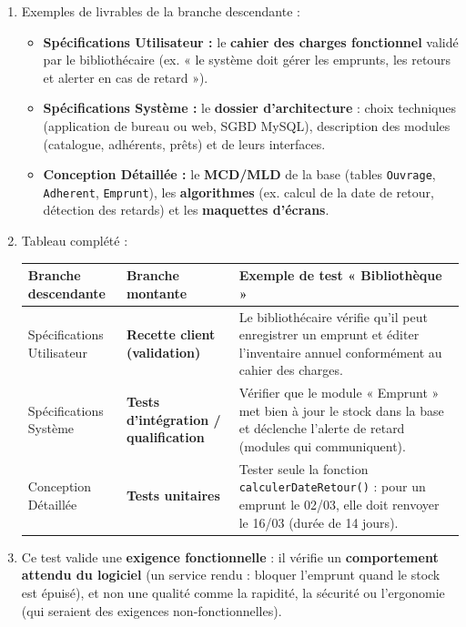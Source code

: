 \documentclass[11pt]{article}
\begin{document}
\begin{corrige}
\begin{enumerate}
    \item Exemples de livrables de la branche descendante :
    \begin{itemize}
        \item \textbf{Spécifications Utilisateur :} le \textbf{cahier des charges fonctionnel} validé par le bibliothécaire (ex. « le système doit gérer les emprunts, les retours et alerter en cas de retard »).
        \item \textbf{Spécifications Système :} le \textbf{dossier d'architecture} : choix techniques (application de bureau ou web, SGBD MySQL), description des modules (catalogue, adhérents, prêts) et de leurs interfaces.
        \item \textbf{Conception Détaillée :} le \textbf{MCD/MLD} de la base (tables \texttt{Ouvrage}, \texttt{Adherent}, \texttt{Emprunt}), les \textbf{algorithmes} (ex. calcul de la date de retour, détection des retards) et les \textbf{maquettes d'écrans}.
    \end{itemize}
    \item Tableau complété :
    \begin{center}
    \begin{tabularx}{\linewidth}{|l|l|X|}
    \hline
    \rowcolor{popblueL}
    \textbf{Branche descendante} & \textbf{Branche montante} & \textbf{Exemple de test « Bibliothèque »} \\
    \hline
    Spécifications Utilisateur & \textbf{Recette client (validation)} & Le bibliothécaire vérifie qu'il peut enregistrer un emprunt et éditer l'inventaire annuel conformément au cahier des charges. \\
    \hline
    Spécifications Système & \textbf{Tests d'intégration / qualification} & Vérifier que le module « Emprunt » met bien à jour le stock dans la base et déclenche l'alerte de retard (modules qui communiquent). \\
    \hline
    Conception Détaillée & \textbf{Tests unitaires} & Tester seule la fonction \texttt{calculerDateRetour()} : pour un emprunt le 02/03, elle doit renvoyer le 16/03 (durée de 14 jours). \\
    \hline
    \end{tabularx}
    \end{center}
    \item Ce test valide une \textbf{exigence fonctionnelle} : il vérifie un \textbf{comportement attendu du logiciel} (un service rendu : bloquer l'emprunt quand le stock est épuisé), et non une qualité comme la rapidité, la sécurité ou l'ergonomie (qui seraient des exigences non-fonctionnelles).

\end{enumerate}
\end{corrige}
\end{document}
